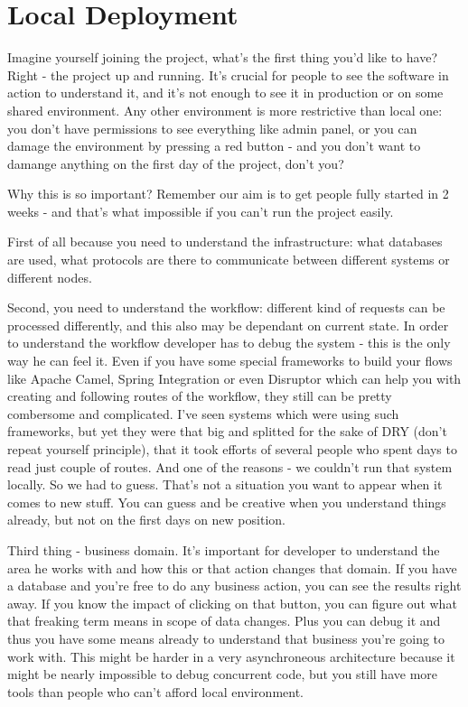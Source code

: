 \documentclass[11pt,a4paper,oneside]{article}
\begin{document}
\section{Local Deployment}
Imagine yourself joining the project, what's the first thing you'd like to have? Right - the project up and running. It's crucial for people to see the software in action to understand it, and it's not enough to see it in production or on some shared environment. Any other environment is more restrictive than local one: you don't have permissions to see everything like admin panel, or you can damage the environment by pressing a red button - and you don't want to damange anything on the first day of the project, don't you?

Why this is so important? Remember our aim is to get people fully started in 2 weeks - and that's what impossible if you can't run the project easily. 

First of all because you need to understand the infrastructure: what databases are used, what protocols are there to communicate between different systems or different nodes. 

Second, you need to understand the workflow: different kind of requests can be processed differently, and this also may be dependant on current state. In order to understand the workflow developer has to debug the system - this is the only way he can feel it. Even if you have some special frameworks to build your flows like Apache Camel, Spring Integration or even Disruptor which can help you with creating and following routes of the workflow, they still can be pretty combersome and complicated. I've seen systems which were using such frameworks, but yet they were that big and splitted for the sake of DRY (don't repeat yourself principle), that it took efforts of several people who spent days to read just couple of routes. And one of the reasons - we couldn't run that system locally. So we had to guess. That's not a situation you want to appear when it comes to new stuff. You can guess and be creative when you understand things already, but not on the first days on new position.

Third thing - business domain. It's important for developer to understand the area he works with and how this or that action changes that domain. If you have a database and you're free to do any business action, you can see the results right away. If you know the impact of clicking on that button, you can figure out what that freaking term means in scope of data changes. Plus you can debug it and thus you have some means already to understand that business you're going to work with. This might be harder in a very asynchroneous architecture because it might be nearly impossible to debug concurrent code, but you still have more tools than people who can't afford local environment.
\end{document}
